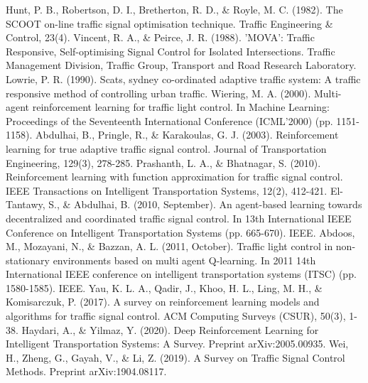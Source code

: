 \documentclass[conference]{IEEEtran}
\begin{document}
\begin{thebibliography}{0}
 Hunt, P. B., Robertson, D. I., Bretherton, R. D., \& Royle, M. C. (1982). The SCOOT on-line traffic signal optimisation technique. Traffic Engineering \& Control, 23(4).
 Vincent, R. A., \& Peirce, J. R. (1988). 'MOVA': Traffic Responsive, Self-optimising Signal Control for Isolated Intersections. Traffic Management Division, Traffic Group, Transport and Road Research Laboratory.
 Lowrie, P. R. (1990). Scats, sydney co-ordinated adaptive traffic system: A traffic responsive method of controlling urban traffic.
 Wiering, M. A. (2000). Multi-agent reinforcement learning for traffic light control. In Machine Learning: Proceedings of the Seventeenth International Conference (ICML'2000) (pp. 1151-1158).
 Abdulhai, B., Pringle, R., \& Karakoulas, G. J. (2003). Reinforcement learning for true adaptive traffic signal control. Journal of Transportation Engineering, 129(3), 278-285.
 Prashanth, L. A., \& Bhatnagar, S. (2010). Reinforcement learning with function approximation for traffic signal control. IEEE Transactions on Intelligent Transportation Systems, 12(2), 412-421.
 El-Tantawy, S., \& Abdulhai, B. (2010, September). An agent-based learning towards decentralized and coordinated traffic signal control. In 13th International IEEE Conference on Intelligent Transportation Systems (pp. 665-670). IEEE.
 Abdoos, M., Mozayani, N., \& Bazzan, A. L. (2011, October). Traffic light control in non-stationary environments based on multi agent Q-learning. In 2011 14th International IEEE conference on intelligent transportation systems (ITSC) (pp. 1580-1585). IEEE.
 Yau, K. L. A., Qadir, J., Khoo, H. L., Ling, M. H., \& Komisarczuk, P. (2017). A survey on reinforcement learning models and algorithms for traffic signal control. ACM Computing Surveys (CSUR), 50(3), 1-38.
 Haydari, A., \& Yilmaz, Y. (2020). Deep Reinforcement Learning for Intelligent Transportation Systems: A Survey. Preprint arXiv:2005.00935.
 Wei, H., Zheng, G., Gayah, V., \& Li, Z. (2019). A Survey on Traffic Signal Control Methods. Preprint arXiv:1904.08117.



\end{thebibliography}
\end{document}
